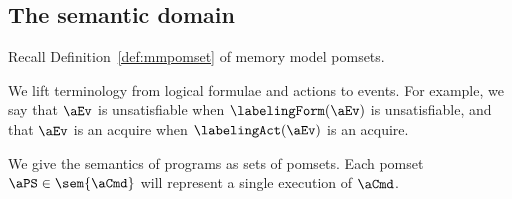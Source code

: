 


\subsection{The semantic domain}
\label{sec:sets}
Recall Definition~\ref{def:mmpomset} of memory model pomsets.

We lift terminology from logical formulae and actions to events. For example,
we say that $\aEv$ is unsatisfiable when $\labelingForm(\aEv)$ is unsatisfiable,
and that $\aEv$ is an acquire when $\labelingAct(\aEv)$ is an acquire.


We give the semantics of programs as sets of pomsets.  Each pomset
$\aPS\in\sem{\aCmd}$ will represent a single execution of $\aCmd$.

